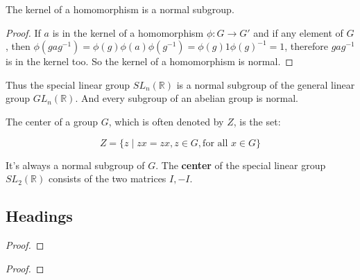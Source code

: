 \documentclass{tufte-handout}
\newcommand{\R}{\mathbb{R}}
\begin{document}
\begin{proposition}
	\normalfont
	The kernel of a homomorphism is a normal subgroup.
\end{proposition}

\begin{proof}
	If $a$ is in the kernel of a homomorphism $\phi: G\rightarrow G'$ and if any element of $G$, then $\phi(gag^{-1})=\phi(g)\phi(a)\phi(g^{-1})=\phi(g)1\phi(g)^{-1}=1$, therefore $gag^{-1}$ is in the kernel too. So the kernel of a homomorphism is normal.
\end{proof}

Thus the special linear group $SL_n(\R)$ is a normal subgroup of the general linear group $GL_n(\R)$. And every subgroup of an abelian group is normal.

The center of a group $G$, which is often denoted by $Z$, is the set:

\begin{equation}
	Z=\{z\mid  zx =zx,z\in G, \text{for all }x \in G\}
\end{equation}

It's always a normal subgroup of $G$. The \textbf{center} of the special linear group $SL_2(\R)$ consists of the two matrices $I,-I$.

\subsection{Headings}\label{sec:headings}
\begin{theorem}%
	\lipsum[1][1-3] %
\end{theorem}

\begin{lemma}%
	\lipsum[1][1-3] %
	
\end{lemma}
\begin{proof}
	\lipsum[1][1-5]
\end{proof}


\begin{corollary}%
	\lipsum[1][1-3] %
\end{corollary}

\begin{proposition}
	\lipsum[1][1-3] %
\end{proposition}
\begin{problem}
	\lipsum[1][1-2]
\end{problem}

\begin{proof}
	\lipsum*[1]
\end{proof}
\end{document}
